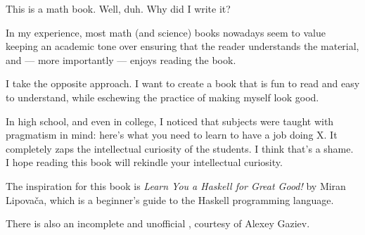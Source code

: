 \label{real-intro}

This is a math book. Well, duh. Why did I write it?

In my experience, most math (and science) books nowadays seem to value keeping
an academic tone over ensuring that the reader understands the material, and ---
more importantly --- enjoys reading the book.

I take the opposite approach. I want to create a book that is fun to read and
easy to understand, while eschewing the practice of making myself look good.

In high school, and even in college, I noticed that subjects were taught with
pragmatism in mind: here's what you need to learn to have a job doing X.  It
completely zaps the intellectual curiosity of the students. I think that's a
shame. I hope reading this book will rekindle your intellectual curiosity.

The inspiration for this book is \emph{Learn You a Haskell for Great Good!} by
Miran Lipova\v{c}a, which is a beginner's guide to the Haskell programming
language.


There is also an incomplete and unofficial , courtesy of Alexey Gaziev.
